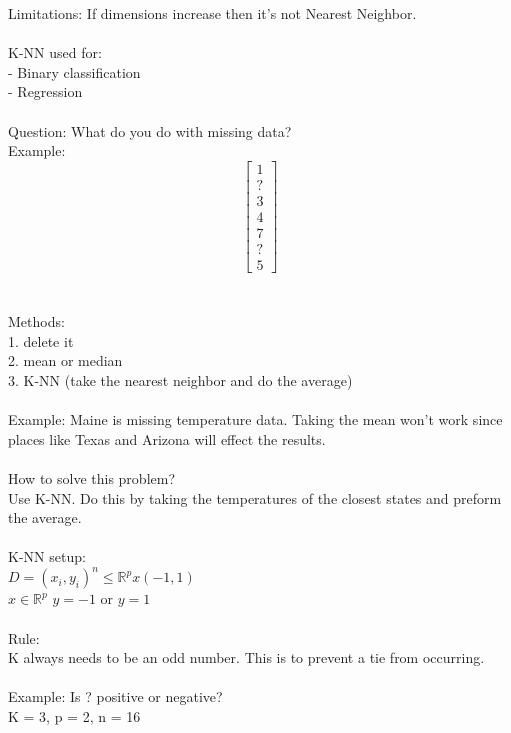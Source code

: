 Limitations: If dimensions increase then it's not Nearest Neighbor. \\\\
K-NN used for: \\
- Binary classification\\
- Regression\\\\
Question: What do you do with missing data?\\
Example:
\[
\begin{bmatrix}
1 \\
? \\
3 \\
4 \\
7 \\
? \\
5
\end{bmatrix}
\] \\\\
Methods:\\
1. delete it \\
2. mean or median \\
3. K-NN (take the nearest neighbor and do the average)\\\\
Example: Maine is missing temperature data. Taking the mean won't work since places like Texas and Arizona will effect the results. \\\\
How to solve this problem? \\
Use K-NN. Do this by taking the temperatures of the closest states and preform the average. \\\\
K-NN setup: \\
$D={(x_i,y_i)}^n \leq \mathbb{R}^px(-1,1)$\\
$x\in \mathbb{R}^p$ $y=-1$ or $y=1$\\\\
Rule:\\
K always needs to be an odd number. This is to prevent a tie from occurring.  \\\\
Example: Is ? positive or negative?\\
K = 3, p = 2, n = 16\\\\
 \\
